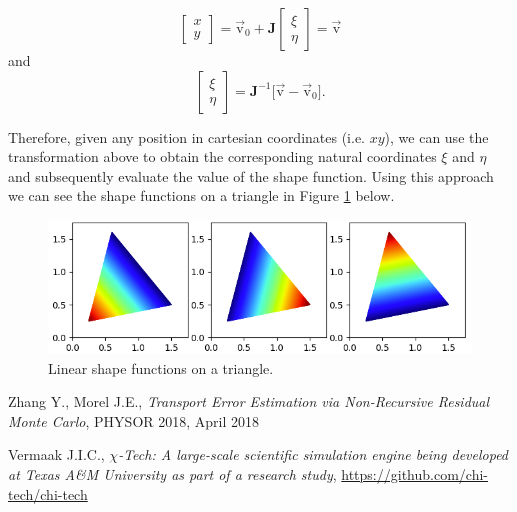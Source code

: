 \documentclass[10pt,letterpaper,notitlepage]{article}
\numberwithin{equation}{section}
\begin{document}
\begin{equation}
\begin{bmatrix}
x \\ y
\end{bmatrix}
=
\vec{\text{v}}_0 + \mathbf{J}
\begin{bmatrix}
\xi \\ \eta
\end{bmatrix}
= \vec{\text{v}}
\end{equation}
and 
\begin{equation}
\begin{bmatrix}
\xi \\ \eta
\end{bmatrix}
= \mathbf{J}^{-1}
\biggr[\vec{\text{v}} -
\vec{\text{v}}_0
\biggr].
\end{equation}

Therefore, given any position in cartesian coordinates (i.e. $xy$), we can use the transformation above to obtain the corresponding natural coordinates $\xi$ and $\eta$ and subsequently evaluate the value of the shape function. Using this approach we can see the shape functions on a triangle in Figure \ref{fig:shapefunctiontri} below.

\begin{figure}[H]
\centering
\includegraphics[width=0.7\linewidth]{figures/ShapeFunctionTri.png}
\caption{Linear shape functions on a triangle.}
\label{fig:shapefunctiontri}
\end{figure}


\newpage 
\begin{thebibliography}{1}
    
     Zhang Y., Morel J.E., {\em Transport Error Estimation via Non-Recursive Residual Monte Carlo}, PHYSOR 2018, April 2018
    
     Vermaak J.I.C., {\em $\chi$-Tech: A large-scale scientific simulation engine being developed at Texas A\&M University as part of a research study}, \url{https://github.com/chi-tech/chi-tech}
    
    
\end{thebibliography}
\end{document}
